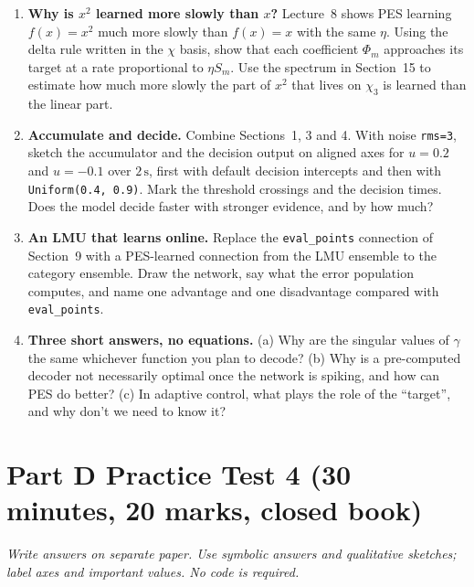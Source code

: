 \documentclass[11pt,letterpaper]{article}
\begin{document}
\begin{enumerate}
\item \textbf{Why is $x^2$ learned more slowly than $x$?} Lecture~8 shows PES learning $f(x) = x^2$ much more slowly than $f(x) = x$ with the same $\eta$. Using the delta rule written in the $\chi$ basis, show that each coefficient $\Phi_m$ approaches its target at a rate proportional to $\eta S_m$. Use the spectrum in Section~15 to estimate how much more slowly the part of $x^2$ that lives on $\chi_3$ is learned than the linear part.
\item \textbf{Accumulate and decide.} Combine Sections~1, 3 and 4. With noise \texttt{rms=3}, sketch the accumulator and the decision output on aligned axes for $u = 0.2$ and $u = -0.1$ over $2\,\mathrm{s}$, first with default decision intercepts and then with \texttt{Uniform(0.4, 0.9)}. Mark the threshold crossings and the decision times. Does the model decide faster with stronger evidence, and by how much?
\item \textbf{An LMU that learns online.} Replace the \texttt{eval\_points} connection of Section~9 with a PES-learned connection from the LMU ensemble to the category ensemble. Draw the network, say what the error population computes, and name one advantage and one disadvantage compared with \texttt{eval\_points}.
\item \textbf{Three short answers, no equations.} (a) Why are the singular values of $\gamma$ the same whichever function you plan to decode? (b) Why is a pre-computed decoder not necessarily optimal once the network is spiking, and how can PES do better? (c) In adaptive control, what plays the role of the ``target'', and why don't we need to know it?
\end{enumerate}

\part*{Part D \quad Practice Test 4 (30 minutes, 20 marks, closed book)}

\textit{Write answers on separate paper. Use symbolic answers and qualitative sketches; label axes and important values. No code is required.}
\end{document}
